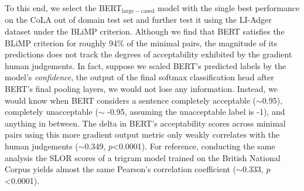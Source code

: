 \DIFaddend To this end, we select the BERT$_{\mathrm{large-cased}}$ model with the single best performance on the CoLA out of domain test set and further test it using the LI-Adger dataset under the BLiMP criterion.  Although we find that BERT satisfies the BLiMP criterion for roughly 94\% of the minimal pairs, the magnitude of its predictions does not track the degrees of acceptability exhibited by the gradient human judgements.  In fact, suppose we scaled BERT's predicted labels by the model's \textit{confidence}, the output of the final softmax classification head after BERT's final pooling layers, we would not lose any information.  Instead, we would know when BERT considers a sentence completely acceptable ($\sim$0.95), completely unacceptable ($\sim$ -0.95, assuming the unacceptable label is -1), and anything in between.  The delta in BERT's acceptability scores across minimal pairs using this more gradient output metric only weakly correlates with the human judgements ($\sim$0.349, $p$<0.0001).  For reference, conducting the same analysis \DIFdelbegin {}\DIFdelend \DIFaddbegin {}\DIFaddend the SLOR scores of a trigram model trained on the British National Corpus \DIFdelbegin {}\DIFdelend \DIFaddbegin {}\DIFaddend yields almost the same Pearson's correlation coefficient ($\sim$0.333, $p$<0.0001).

\DIFaddbegin 


\DIFaddend %

\DIFaddbegin 

